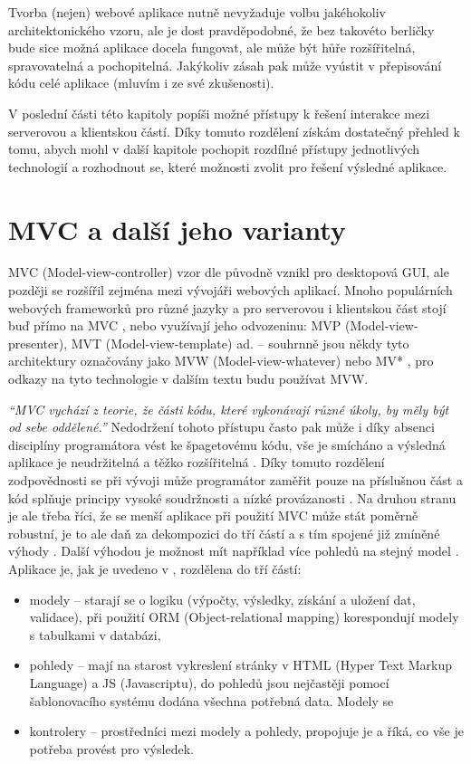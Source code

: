 Tvorba (nejen) webové aplikace nutně nevyžaduje volbu jakéhokoliv architektonického vzoru, ale je dost pravděpodobné, že bez takovéto berličky bude sice možná aplikace docela fungovat, ale může být hůře rozšířitelná, spravovatelná a pochopitelná. Jakýkoliv zásah pak může vyústit v přepisování kódu celé aplikace (mluvím i ze své zkušenosti).

V poslední části této kapitoly popíši možné přístupy k řešení interakce mezi serverovou a klientskou částí. Díky tomuto rozdělení získám dostatečný přehled k tomu, abych mohl v další kapitole pochopit rozdílné přístupy jednotlivých technologií a rozhodnout se, které možnosti zvolit pro řešení výsledné aplikace.

    \section{MVC a další jeho varianty}\label{mvc}
    MVC (Model-view-controller) vzor dle \cite{mvc-cz1} původně vznikl pro desktopová GUI, ale později se rozšířil zejména mezi vývojáři webových aplikací. Mnoho populárních webových frameworků pro různé jazyky a pro serverovou i klientskou část stojí buď přímo na MVC \cite{mvc-cz1}, nebo využívají jeho odvozeninu: MVP (Model-view-presenter), MVT (Model-view-template) ad. -- souhrnně jsou někdy tyto architektury označovány jako MVW (Model-view-whatever) nebo MV* \cite{mvw}, pro odkazy na tyto technologie v dalším textu budu používat MVW.
    
    \textit{\enquote{MVC vychází z teorie, že části kódu, které vykonávají různé úkoly, by měly být od sebe oddělené.}} \cite{mvc-cz2} Nedodržení tohoto přístupu často pak může i díky absenci disciplíny programátora vést ke špagetovému kódu, vše je smícháno a výsledná aplikace je neudržitelná a těžko rozšířitelná \cite{mvc-cz2,mvc-2}. Díky tomuto rozdělení zodpovědnosti se při vývoji může programátor zaměřit pouze na příslušnou část a kód splňuje principy vysoké soudržnosti a nízké provázanosti \cite{mvc-medium1}. Na druhou stranu je ale třeba říci, že se menší aplikace při použití MVC může stát poměrně robustní, je to ale daň za dekompozici do tří částí a s tím spojené již zmíněné výhody \cite{mvc-medium1}. Další výhodou je možnost mít například více pohledů na stejný model \cite{mvc-1}. Aplikace je, jak je uvedeno v \cite{mvc-cz2}, rozdělena do tří částí:
    \begin{itemize}
        \item modely -- starají se o logiku (výpočty, výsledky, získání a uložení dat, validace), při použití ORM (Object-relational mapping) korespondují modely s tabulkami v databázi,
        \item pohledy -- mají na starost vykreslení stránky v HTML (Hyper Text Markup Language) a JS (Javascriptu), do pohledů jsou nejčastěji pomocí šablonovacího systému dodána všechna potřebná data. Modely se 
        \item kontrolery -- prostředníci mezi modely a pohledy, propojuje je a říká, co vše je potřeba provést pro výsledek.
    \end{itemize}
    
